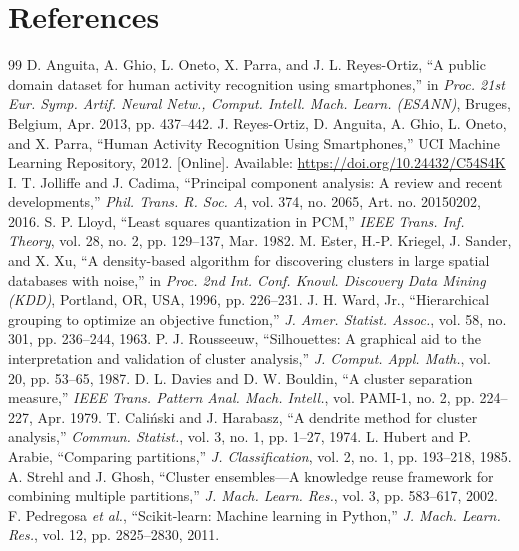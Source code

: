 \documentclass[12pt,a4paper]{article}
\begin{document}
\section{References}
\begingroup
\small
\renewcommand{\section}[2]{}%
\begin{thebibliography}{99}
 D. Anguita, A. Ghio, L. Oneto, X. Parra, and J. L. Reyes-Ortiz, ``A public domain dataset for human activity recognition using smartphones,'' in \emph{Proc. 21st Eur. Symp. Artif. Neural Netw., Comput. Intell. Mach. Learn. (ESANN)}, Bruges, Belgium, Apr. 2013, pp. 437--442.
 J. Reyes-Ortiz, D. Anguita, A. Ghio, L. Oneto, and X. Parra, ``Human Activity Recognition Using Smartphones,'' UCI Machine Learning Repository, 2012. [Online]. Available: \url{https://doi.org/10.24432/C54S4K}
 I. T. Jolliffe and J. Cadima, ``Principal component analysis: A review and recent developments,'' \emph{Phil. Trans. R. Soc. A}, vol. 374, no. 2065, Art. no. 20150202, 2016.
 S. P. Lloyd, ``Least squares quantization in PCM,'' \emph{IEEE Trans. Inf. Theory}, vol. 28, no. 2, pp. 129--137, Mar. 1982.
 M. Ester, H.-P. Kriegel, J. Sander, and X. Xu, ``A density-based algorithm for discovering clusters in large spatial databases with noise,'' in \emph{Proc. 2nd Int. Conf. Knowl. Discovery Data Mining (KDD)}, Portland, OR, USA, 1996, pp. 226--231.
 J. H. Ward, Jr., ``Hierarchical grouping to optimize an objective function,'' \emph{J. Amer. Statist. Assoc.}, vol. 58, no. 301, pp. 236--244, 1963.
 P. J. Rousseeuw, ``Silhouettes: A graphical aid to the interpretation and validation of cluster analysis,'' \emph{J. Comput. Appl. Math.}, vol. 20, pp. 53--65, 1987.
 D. L. Davies and D. W. Bouldin, ``A cluster separation measure,'' \emph{IEEE Trans. Pattern Anal. Mach. Intell.}, vol. PAMI-1, no. 2, pp. 224--227, Apr. 1979.
 T. Cali\'{n}ski and J. Harabasz, ``A dendrite method for cluster analysis,'' \emph{Commun. Statist.}, vol. 3, no. 1, pp. 1--27, 1974.
 L. Hubert and P. Arabie, ``Comparing partitions,'' \emph{J. Classification}, vol. 2, no. 1, pp. 193--218, 1985.
 A. Strehl and J. Ghosh, ``Cluster ensembles---A knowledge reuse framework for combining multiple partitions,'' \emph{J. Mach. Learn. Res.}, vol. 3, pp. 583--617, 2002.
 F. Pedregosa \emph{et al.}, ``Scikit-learn: Machine learning in Python,'' \emph{J. Mach. Learn. Res.}, vol. 12, pp. 2825--2830, 2011.
\end{thebibliography}
\endgroup
\end{document}
